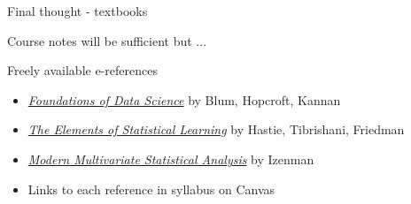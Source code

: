 \documentclass{beamer}
\begin{document}
\begin{frame}{Final thought - textbooks}
\begin{block}{Course notes will be sufficient but ...}
\end{block}
\begin{block}{Freely available e-references}
\begin{itemize}
\item \href{https://www.cs.cornell.edu/jeh/book.pdf}{\emph{Foundations of Data Science}} by Blum, Hopcroft, Kannan
\item \href{https://web.stanford.edu/~hastie/ElemStatLearn/}{\emph{The Elements of Statistical Learning}} by Hastie, Tibrishani, Friedman
\item \href{https://hollis.harvard.edu/primo-explore/fulldisplay?context=L&vid=HVD2&search_scope=everything&tab=everything&lang=en_US&docid=01HVD_ALMA212150160370003941}{\emph{Modern Multivariate Statistical Analysis}} by Izenman 
\item Links to each reference in syllabus on Canvas
\end{itemize}
\end{block}
\end{frame}
\end{document}
